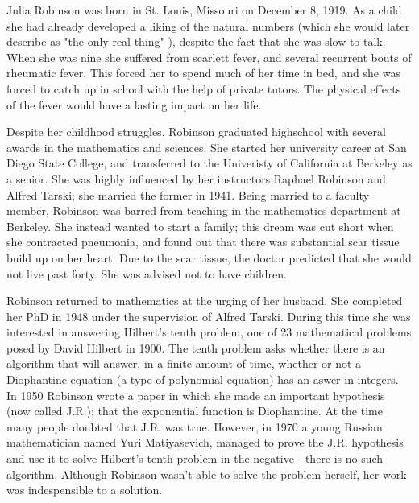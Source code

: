 \documentclass[../../../include/open-logic-section]{subfiles}
\begin{document}



Julia Robinson was born in St. Louis, Missouri on December 8, 1919. As a
child she had already developed a liking of the natural numbers (which she
would later describe as "the only real thing" \citep[xix]{Feferman1996}),
despite the fact that she was slow to talk. When she was nine she suffered
from scarlett fever, and several recurrent bouts of rheumatic fever. This
forced her to spend much of her time in bed, and she was forced to catch up
in school with the help of private tutors. The physical effects of the
fever would have a lasting impact on her life.

Despite her childhood struggles, Robinson graduated highschool with several
awards in the mathematics and sciences. She started her university career
at San Diego State College, and transferred to the Univeristy of California
at Berkeley as a senior. She was highly influenced by her instructors
Raphael Robinson and Alfred Tarski; she married the former in 1941. Being
married to a faculty member, Robinson was barred from teaching in the
mathematics department at Berkeley. She instead wanted to start a family;
this dream was cut short when she contracted pneumonia, and found out that
there was substantial scar tissue build up on her heart. Due to the scar
tissue, the doctor predicted that she would not live past forty. She was
advised not to have children.

Robinson returned to mathematics at the urging of her husband. She
completed her PhD in 1948 under the supervision of Alfred Tarski. During
this time she was interested in answering Hilbert's tenth problem, one of
23 mathematical problems posed by David Hilbert in 1900. The tenth problem
asks whether there is an algorithm that will answer, in a finite amount of
time, whether or not a Diophantine equation (a type of polynomial equation)
has an aswer in integers. In 1950 Robinson wrote a paper in which she made
an important hypothesis (now called J.R.); that the exponential function is
Diophantine. At the time many people doubted that J.R. was true. However,
in 1970 a young Russian mathematician named Yuri Matiyasevich, managed to
prove the J.R. hypothesis and use it to solve Hilbert's tenth problem in
the negative - there is no such algorithm. Although Robinson wasn't able to
solve the problem herself, her work was indespensible to a solution.
\end{document}

